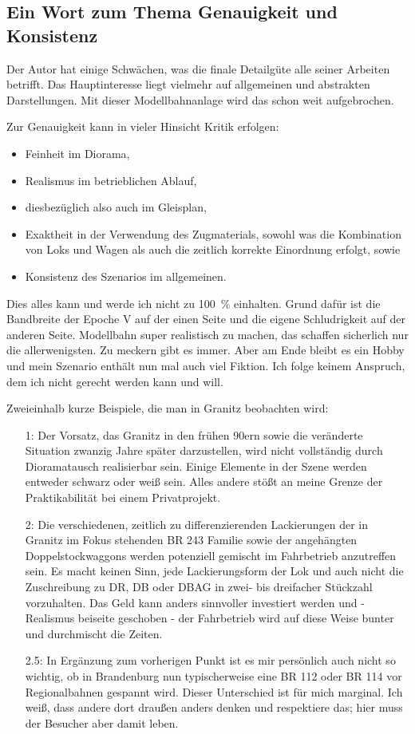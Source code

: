 \subsection{Ein Wort zum Thema Genauigkeit und Konsistenz}
\label{sec:modelingAccuracy}

Der Autor hat einige Schw\"achen, was die finale Detailg\"ute alle seiner Arbeiten betrifft.
Das Hauptinteresse liegt vielmehr auf allgemeinen und abstrakten Darstellungen.
Mit dieser Modellbahnanlage wird das schon weit aufgebrochen.

Zur Genauigkeit kann in vieler Hinsicht Kritik erfolgen:
\begin{itemize}
	\item Feinheit im Diorama,
	\item Realismus im betrieblichen Ablauf,
	\item diesbez\"uglich also auch im Gleisplan,
	\item Exaktheit in der Verwendung des Zugmaterials, sowohl was die Kombination von Loks und Wagen als auch die zeitlich korrekte Einordnung erfolgt, sowie
	\item Konsistenz des Szenarios im allgemeinen.
\end{itemize}

Dies alles kann und werde ich nicht zu 100~\% einhalten.
Grund daf\"ur ist die Bandbreite der Epoche V auf der einen Seite und die eigene Schludrigkeit auf der anderen Seite.
Modellbahn super realistisch zu machen, das schaffen sicherlich nur die allerwenigsten.
Zu meckern gibt es immer.
Aber am Ende bleibt es ein Hobby und mein Szenario enth\"alt nun mal auch viel Fiktion.
Ich folge keinem Anspruch, dem ich nicht gerecht werden kann und will.

Zweieinhalb kurze Beispiele, die man in Granitz beobachten wird:
\begin{itemize}
	\item[1:] Der Vorsatz, das Granitz in den fr\"uhen 90ern sowie die ver\"anderte Situation zwanzig Jahre sp\"ater darzustellen, wird nicht vollst\"andig durch Dioramatausch realisierbar sein.
	Einige Elemente in der Szene werden entweder schwarz oder wei{\ss} sein.
	Alles andere st\"o{\ss}t an meine Grenze der Praktikabilit\"at bei einem Privatprojekt.
	\item[2:] Die verschiedenen, zeitlich zu differenzierenden Lackierungen der in Granitz im Fokus stehenden BR 243 Familie sowie der angeh\"angten Doppelstockwaggons werden potenziell gemischt im Fahrbetrieb anzutreffen sein.
	Es macht keinen Sinn, jede Lackierungsform der Lok und auch nicht die Zuschreibung zu DR, DB oder DBAG in zwei- bis dreifacher St\"uckzahl vorzuhalten.
	Das Geld kann anders sinnvoller investiert werden und - Realismus beiseite geschoben - der Fahrbetrieb wird auf diese Weise bunter und durchmischt die Zeiten.
	\item[2.5:] In Erg\"anzung zum vorherigen Punkt ist es mir pers\"onlich auch nicht so wichtig, ob in Brandenburg nun typischerweise eine BR 112 oder BR 114 vor Regionalbahnen gespannt wird.
	Dieser Unterschied ist f\"ur mich marginal.
	Ich wei{\ss}, dass andere dort drau{\ss}en anders denken und respektiere das; hier muss der Besucher aber damit leben.
\end{itemize}

